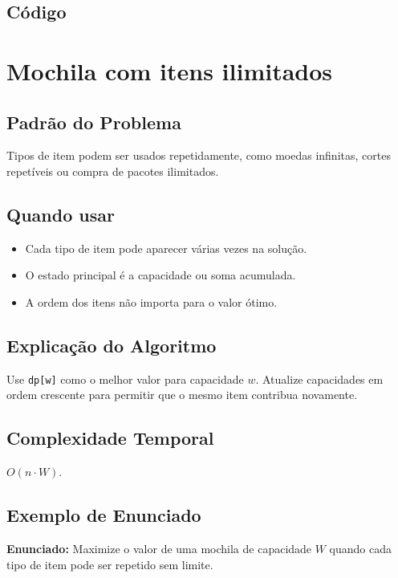 \subsection{Código}

\section{Mochila com itens ilimitados}

\subsection{Padrão do Problema}
Tipos de item podem ser usados repetidamente, como moedas infinitas, cortes repetíveis ou compra de pacotes ilimitados.

\subsection{Quando usar}
\begin{itemize}[nosep]
  \item Cada tipo de item pode aparecer várias vezes na solução.
  \item O estado principal é a capacidade ou soma acumulada.
  \item A ordem dos itens não importa para o valor ótimo.
\end{itemize}

\subsection{Explicação do Algoritmo}
Use \texttt{dp[w]} como o melhor valor para capacidade $w$. Atualize capacidades em ordem crescente para permitir que o mesmo item contribua novamente.

\subsection{Complexidade Temporal}
$O(n \cdot W)$.

\subsection{Exemplo de Enunciado}
\begin{exemplodiabox}
\textbf{Enunciado:} Maximize o valor de uma mochila de capacidade $W$ quando cada tipo de item pode ser repetido sem limite.
\end{exemplodiabox}


